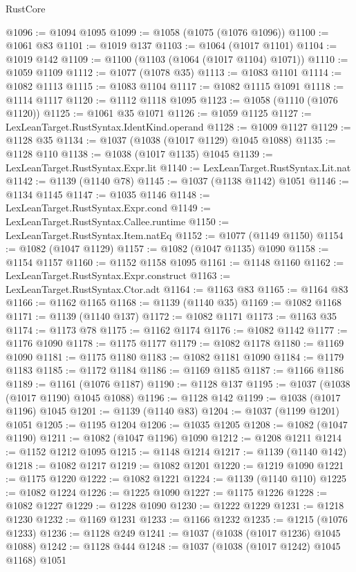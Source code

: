 \begin{lexlean}{RustCore}
\begin{coremodule}
@1096 := @1094 @1095
@1099 := @1058 (@1075 (@1076 @1096))
@1100 := @1061 @83
@1101 := @1019 @137
@1103 := @1064 (@1017 @1101)
@1104 := @1019 @142
@1109 := @1100 (@1103 (@1064 (@1017 @1104) @1071))
@1110 := @1059 @1109
@1112 := @1077 (@1078 @35)
@1113 := @1083 @1101
@1114 := @1082 @1113
@1115 := @1083 @1104
@1117 := @1082 @1115 @1091
@1118 := @1114 @1117
@1120 := @1112 @1118 @1095
@1123 := @1058 (@1110 (@1076 @1120))
@1125 := @1061 @35 @1071
@1126 := @1059 @1125
@1127 := LexLeanTarget.RustSyntax.IdentKind.operand
@1128 := @1009 @1127
@1129 := @1128 @35
@1134 := @1037 (@1038 (@1017 @1129) @1045 @1088)
@1135 := @1128 @110
@1138 := @1038 (@1017 @1135) @1045
@1139 := LexLeanTarget.RustSyntax.Expr.lit
@1140 := LexLeanTarget.RustSyntax.Lit.nat
@1142 := @1139 (@1140 @78)
@1145 := @1037 (@1138 @1142) @1051
@1146 := @1134 @1145
@1147 := @1035 @1146
@1148 := LexLeanTarget.RustSyntax.Expr.cond
@1149 := LexLeanTarget.RustSyntax.Callee.runtime
@1150 := LexLeanTarget.RustSyntax.Item.natEq
@1152 := @1077 (@1149 @1150)
@1154 := @1082 (@1047 @1129)
@1157 := @1082 (@1047 @1135) @1090
@1158 := @1154 @1157
@1160 := @1152 @1158 @1095
@1161 := @1148 @1160
@1162 := LexLeanTarget.RustSyntax.Expr.construct
@1163 := LexLeanTarget.RustSyntax.Ctor.adt
@1164 := @1163 @83
@1165 := @1164 @83
@1166 := @1162 @1165
@1168 := @1139 (@1140 @35)
@1169 := @1082 @1168
@1171 := @1139 (@1140 @137)
@1172 := @1082 @1171
@1173 := @1163 @35
@1174 := @1173 @78
@1175 := @1162 @1174
@1176 := @1082 @1142
@1177 := @1176 @1090
@1178 := @1175 @1177
@1179 := @1082 @1178
@1180 := @1169 @1090
@1181 := @1175 @1180
@1183 := @1082 @1181 @1090
@1184 := @1179 @1183
@1185 := @1172 @1184
@1186 := @1169 @1185
@1187 := @1166 @1186
@1189 := @1161 (@1076 @1187)
@1190 := @1128 @137
@1195 := @1037 (@1038 (@1017 @1190) @1045 @1088)
@1196 := @1128 @142
@1199 := @1038 (@1017 @1196) @1045
@1201 := @1139 (@1140 @83)
@1204 := @1037 (@1199 @1201) @1051
@1205 := @1195 @1204
@1206 := @1035 @1205
@1208 := @1082 (@1047 @1190)
@1211 := @1082 (@1047 @1196) @1090
@1212 := @1208 @1211
@1214 := @1152 @1212 @1095
@1215 := @1148 @1214
@1217 := @1139 (@1140 @142)
@1218 := @1082 @1217
@1219 := @1082 @1201
@1220 := @1219 @1090
@1221 := @1175 @1220
@1222 := @1082 @1221
@1224 := @1139 (@1140 @110)
@1225 := @1082 @1224
@1226 := @1225 @1090
@1227 := @1175 @1226
@1228 := @1082 @1227
@1229 := @1228 @1090
@1230 := @1222 @1229
@1231 := @1218 @1230
@1232 := @1169 @1231
@1233 := @1166 @1232
@1235 := @1215 (@1076 @1233)
@1236 := @1128 @249
@1241 := @1037 (@1038 (@1017 @1236) @1045 @1088)
@1242 := @1128 @444
@1248 := @1037 (@1038 (@1017 @1242) @1045 @1168) @1051

\end{coremodule}
\end{lexlean}
